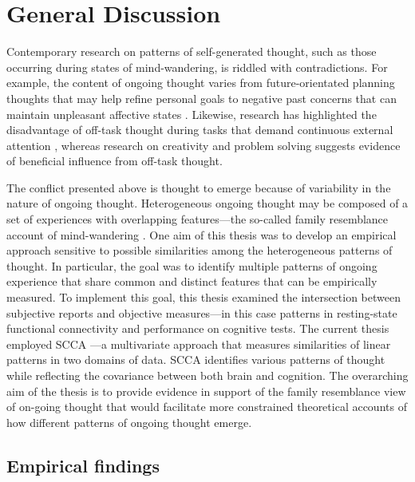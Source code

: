 \chapter{General Discussion}
\label{ch:discussion}
Contemporary research on patterns of self-generated thought, such as those occurring during states of mind-wandering, is riddled with contradictions. For example, the content of ongoing thought varies from future-orientated planning thoughts that may help refine personal goals \cite{Medea2016} to negative past concerns that can maintain unpleasant affective states \cite{Killingsworth2010}. Likewise, research has highlighted the disadvantage of off-task thought during tasks that demand continuous external attention \cite{McVayJOEP2009,McVay2012}, whereas research on creativity and problem solving suggests evidence of beneficial influence from off-task thought\cite{Smeekens2016,Baird2012}.

The conflict presented above is thought to emerge because of variability in the nature of ongoing thought. Heterogeneous ongoing thought may be composed of a set of experiences with overlapping features---the so-called family resemblance account of mind-wandering \cite{Smallwood2013, Seli2018}. One aim of this thesis was to develop an empirical approach sensitive to possible similarities among the heterogeneous patterns of thought. 
In particular, the goal was to identify multiple patterns of ongoing experience that share common and distinct features that can be empirically measured. To implement this goal, this thesis examined the intersection between subjective reports and objective measures---in this case patterns in resting-state functional connectivity and performance on cognitive tests. The current thesis employed SCCA \cite{WittenSCCA2009}---a multivariate approach that measures similarities of linear patterns in two domains of data. SCCA identifies various patterns of thought while reflecting the covariance between both brain and cognition.
The overarching aim of the thesis is to provide evidence in support of the family resemblance view of on-going thought that would facilitate more constrained theoretical accounts of how different patterns of ongoing thought emerge.

\section{Empirical findings}
\label{ch:discussion:results}

